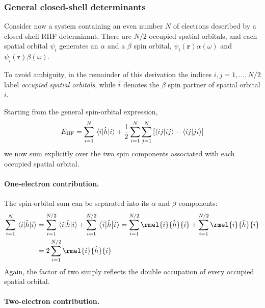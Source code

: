 \documentclass[11pt,a4paper,titlepage]{article}
\numberwithin{equation}{section}
\newcommand{\EHF}{E_\text{HF}}
\newcommand{\br}{\boldsymbol{r}}
\newcommand{\hh}{\Hat{h}}
\begin{document}

\subsubsection{General closed-shell determinants}

Consider now a system containing an even number $N$ of electrons described
by a closed-shell RHF determinant. There are $N/2$ occupied spatial orbitals,
and each spatial orbital $\psi_i$ generates an $\alpha$ and a $\beta$ spin
orbital,
  $\psi_i(\br)\alpha(\omega)$
  and
  $\psi_i(\br)\beta(\omega)$.

To avoid ambiguity, in the remainder of this derivation the indices
$i,j=1,\ldots,N/2$ label \emph{occupied spatial orbitals}, while
$\Bar{i}$ denotes the $\beta$ spin partner of spatial orbital $i$.

Starting from the general spin-orbital expression,
\begin{equation}
  \EHF
  =
  \sum_{i=1}^{N}\mel{i}{\hh}{i}
  +
  \frac{1}{2}
  \sum_{i=1}^{N}\sum_{j=1}^{N}
  \qty[
    \braket{ij}{ij}
    -
    \braket{ij}{ji}
  ]
  \label{eq:rhf-start-spin}
\end{equation}
we now sum explicitly over the two spin components associated with each
occupied spatial orbital.

\paragraph{One-electron contribution.}

The spin-orbital sum can be separated into its $\alpha$ and $\beta$
components:
\begin{equation}
\begin{split}
  \sum_{i=1}^{N}\mel{i}{\hh}{i}
  &=
  \sum_{i=1}^{N/2}\mel{i}{\hh}{i}
  +
  \sum_{i=1}^{N/2}\mel{\Bar{i}}{\hh}{\Bar{i}}
  =
  \sum_{i=1}^{N/2}\rmel{i}{\hh}{i}
  +
  \sum_{i=1}^{N/2}\rmel{i}{\hh}{i}
  \\
  &=
  2\sum_{i=1}^{N/2}\rmel{i}{\hh}{i}
  \label{eq:rhf-one-electron-spatial}
\end{split}
\end{equation}
Again, the factor of two simply reflects the double occupation of every
occupied spatial orbital.

\paragraph{Two-electron contribution.}
\end{document}
